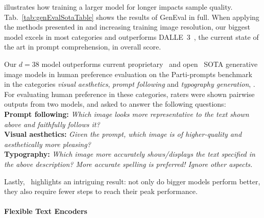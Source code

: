  illustrates how training a larger model for longer impacts sample quality.
Tab.~\ref{tab:genEvalSotaTable} shows the results of GenEval in full. When applying the methods presented in  and increasing training image resolution, our biggest model excels in most categories and
outperforms DALLE~3~\cite{betker2023improving}, the current state of the art in prompt comprehension, in overall score. 
\dropthememb

Our $d=38$ model outperforms current proprietary~\cite{betker2023improving,ideogramv1} and open~\cite{sauer2023adversarial,playgroundv25,chen2023pixart,pernias2023wuerstchen} SOTA generative image models in human preference evaluation on the Parti-prompts benchmark~\cite{yu2022scaling} in the categories \emph{visual aesthetics}, \emph{prompt following} and \emph{typography generation}, \cf {}. For evaluating human preference in these categories, raters were shown pairwise outputs from two models, and asked to answer the following questions: \\
\textbf{Prompt following:} \textit{Which image looks more \emph{representative} to the \emph{tex}t shown above and \emph{faithfully} follows it?} \\
\textbf{Visual aesthetics:} \textit{Given the prompt, which image is of \emph{higher-quality} and \emph{aesthetically more pleasing}?} \\
\textbf{Typography:} \textit{Which image more accurately shows/displays the text specified in the above description? More accurate spelling is preferred! Ignore other aspects.}

Lastly,~ highlights an intriguing result: not only do bigger models perform better, they also require fewer steps to reach their peak performance.

\genEvalSotaTable
\biggerismorestepefficient

\paragraph{Flexible Text Encoders}
%

